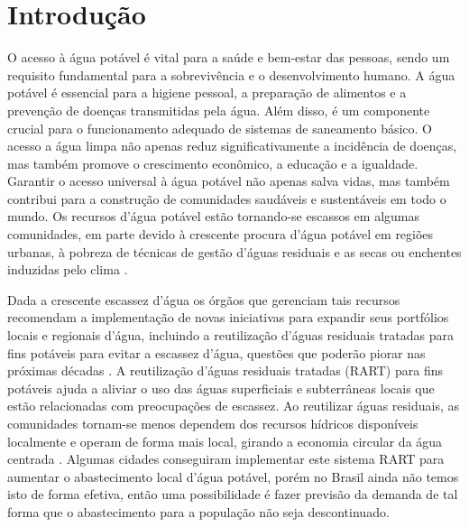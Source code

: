 


\section{Introdu{\c c}{\~a}o} \label{sec:int}


O acesso à água potável é vital para a saúde e bem-estar das pessoas, sendo um requisito fundamental para a sobrevivência e o desenvolvimento humano. A água potável é essencial para a higiene pessoal, a preparação de alimentos e a prevenção de doenças transmitidas pela água. Além disso, é um componente crucial para o funcionamento adequado de sistemas de saneamento básico. O acesso a água limpa não apenas reduz significativamente a incidência de doenças, mas também promove o crescimento econômico, a educação e a igualdade. Garantir o acesso universal à água potável não apenas salva vidas, mas também contribui para a construção de comunidades saudáveis e sustentáveis em todo o mundo. Os recursos d'água potável estão tornando-se escassos em algumas comunidades, em parte devido à crescente procura d'água potável em regiões urbanas, à pobreza de técnicas de gestão d'águas residuais e as secas ou enchentes induzidas pelo clima
\cite{10.2166/wp.2022.071}.

Dada a crescente escassez d'água os órgãos que gerenciam tais recursos recomendam a implementação de novas iniciativas para expandir seus portfólios locais e regionais d'água, incluindo a reutilização d'águas residuais tratadas para fins potáveis para evitar a escassez d'água, questões que poderão piorar nas próximas décadas \cite{BARNES2023139587}. A reutilização d'águas residuais tratadas (RART) para fins potáveis ajuda a aliviar o uso das águas superficiais e subterrâneas locais que estão relacionadas com preocupações de escassez. Ao reutilizar águas residuais, as comunidades tornam-se menos dependem dos recursos hídricos disponíveis localmente e operam de forma mais local, girando a economia circular da água centrada \cite{TSATSOU2023136325}. Algumas cidades conseguiram implementar este sistema RART para aumentar o abastecimento local d'água potável, porém no Brasil ainda não temos isto de forma efetiva, então uma possibilidade é fazer previsão da demanda de tal forma que o abastecimento para a população não seja descontinuado. 

